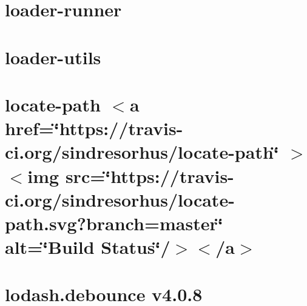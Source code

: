 \documentclass[twoside]{book}
\newcommand{\+}{\discretionary{\mbox{\scriptsize$\hookleftarrow$}}{}{}}
\begin{document}
\chapter{loader-\/runner}
\label{md__c___users_vaishnavi_jadhav__desktop__developer_code_mean_stack_example_client_node_modules_loader_runner__r_e_a_d_m_e}

\chapter{loader-\/utils}
\label{md__c___users_vaishnavi_jadhav__desktop__developer_code_mean_stack_example_client_node_modules_loader_utils__r_e_a_d_m_e}

\chapter{locate-\/path \texorpdfstring{$<$}{<}a href=\char`\"{}https\+://travis-\/ci.\+org/sindresorhus/locate-\/path\char`\"{} \texorpdfstring{$>$}{>}\texorpdfstring{$<$}{<}img src=\char`\"{}https\+://travis-\/ci.\+org/sindresorhus/locate-\/path.\+svg?branch=master\char`\"{} alt=\char`\"{}\+Build Status\char`\"{}/\texorpdfstring{$>$}{>}\texorpdfstring{$<$}{<}/a\texorpdfstring{$>$}{>}}
\label{md__c___users_vaishnavi_jadhav__desktop__developer_code_mean_stack_example_client_node_modules_locate_path_readme}

\chapter{lodash.\+debounce v4.0.8}
\label{md__c___users_vaishnavi_jadhav__desktop__developer_code_mean_stack_example_client_node_modules_lodash_debounce__r_e_a_d_m_e}

\end{document}
